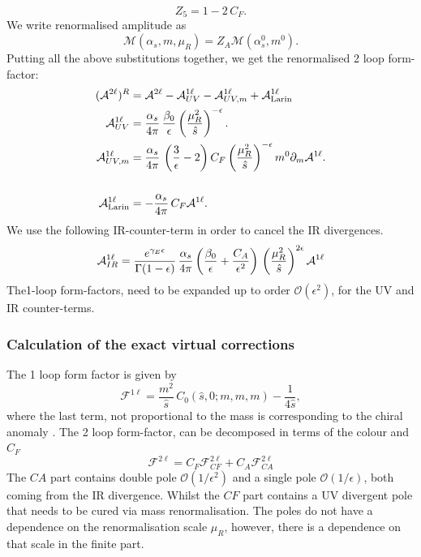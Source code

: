 \begin{equation}
	Z_5 = 1- 2\, C_F.
\end{equation}
We write renormalised amplitude as
\begin{equation}
	\mathcal M  (\alpha_s, m, \mu_R) = Z_A \mathcal M( \alpha_s^0, m^0).
\end{equation}
Putting all the above substitutions together, we get the renormalised  2 loop form-factor:
\begin{align}
	( \mathcal A ^{2 \ell})^R &= 	\mathcal A ^{2 \ell} -	\mathcal A_{UV} ^{1 \ell}- 	\mathcal A_{UV, m} ^{1 \ell} + \mathcal A_{\text{Larin}} ^{1 \ell}   \\
	\mathcal A_{UV} ^{1 \ell} &= \frac{\alpha_s}{4 \pi}\,\frac{\beta_0}{\epsilon} \left( \frac{\mu_R^2}{\hat s} \right) ^{ -\epsilon}.  \nonumber \\
	\mathcal A_{UV, m} ^{1 \ell} &= \frac{\alpha_s}{4 \pi} \, \left( \frac{3}{\epsilon} -2\right) C_F \left( \frac{\mu_R^2}{\hat s} \right) ^{ -\epsilon} m^0 \partial_m \mathcal A^{1 \ell} . \nonumber \\
	\\
	\mathcal	A_{\text{Larin}} ^{1 \ell}  &= - \frac{\alpha_s}{4 \pi} \, C_F  \mathcal A ^{1 \ell} .\nonumber
\end{align}
We use the following IR-counter-term in order to cancel the IR divergences.
\begin{equation}
	\mathcal A_{IR} ^{1 \ell}  = \frac{e^{\gamma_E \epsilon}}{\Gamma(1-\epsilon)} \, \frac{\alpha_s}{4 \pi} \left( \frac{\beta_0}{\epsilon} + \frac{ C_A}{\epsilon^2} \right)  \, \left(  \frac{\mu_R^2}{\hat s}\right) ^{2\epsilon} \mathcal A ^{1 \ell}
\end{equation}
The1-loop form-factors, need to be expanded up to order $ \mathcal O(\epsilon^2) $, for the UV and IR counter-terms.
\subsubsection{Calculation of the exact virtual corrections}
The 1 loop form factor is given by
\begin{equation}
	\mathcal F ^{1 \ell}  = \frac{m^2}{\hat s} \, C_0(\hat s,0; m,m,m) - \frac{1}{4 \hat s},
\end{equation}
where the last term, not proportional to the mass is corresponding to  the chiral anomaly .
The 2 loop form-factor, can be decomposed in terms of the colour and $ C_F$
\begin{equation}
	\mathcal F ^{2 \ell}   = C_F \mathcal F_{CF} ^{2 \ell}  + C_A \mathcal F_{CA} ^{2 \ell}
\end{equation}
The $CA$ part contains double pole $ \mathcal O( 1/\epsilon^2) $  and a single pole $ \mathcal O( 1/\epsilon) $, both  coming from the IR divergence. Whilst the $CF$ part contains a UV divergent pole that needs to be cured via mass renormalisation. The poles do not have a dependence on the renormalisation scale $ \mu_R$, however, there is a dependence on that scale in the finite part.
